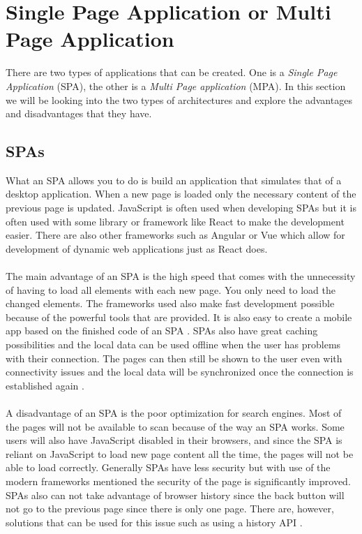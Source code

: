 \section{Single Page Application or Multi Page Application}
There are two types of applications that can be created.
One is a \textit{Single Page Application} (SPA), the other is a \textit{Multi Page application} (MPA).
In this section we will be looking into the two types of architectures and explore the advantages and disadvantages that they have.

\subsection{SPAs}
What an SPA allows you to do is build an application that simulates that of a desktop application. 
When a new page is loaded only the necessary content of the previous page is updated.
JavaScript is often used when developing SPAs but it is often used with some library or framework like React to make the development easier.
There are also other frameworks such as Angular or Vue which allow for development of dynamic web applications just as React does. 
\\\\
The main advantage of an SPA is the high speed that comes with the unnecessity of having to load all elements with each new page.
You only need to load the changed elements. 
The frameworks used also make fast development possible because of the powerful tools that are provided. 
It is also easy to create a mobile app based on the finished code of an SPA \cite{SPAvsMPAMerehead}.
SPAs also have great caching possibilities and the local data can be used offline when the user has problems with their connection. 
The pages can then still be shown to the user even with connectivity issues and the local data will be synchronized once the connection is established again \cite{SPAvsMPARuby}.
\\\\
A disadvantage of an SPA is the poor optimization for search engines.
Most of the pages will not be available to scan because of the way an SPA works. 
Some users will also have JavaScript disabled in their browsers, and since the SPA is reliant on JavaScript to load new page content all the time, the pages will not be able to load correctly.
Generally SPAs have less security but with use of the modern frameworks mentioned the security of the page is significantly improved.
SPAs also can not take advantage of browser history since the back button will not go to the previous page since there is only one page. 
There are, however, solutions that can be used for this issue such as using a history API \cite{SPAvsMPAMerehead}.

